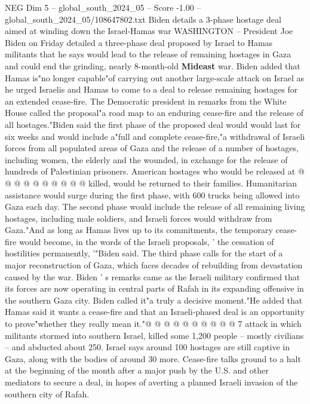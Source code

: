 \begin{textsample}{NEG Dim 5 – global\_south\_2024\_05 – Score -1.00 – global\_south\_2024\_05/108647802.txt}  \label{ex:f5_neg_382}
Biden details a 3-phase hostage deal aimed at winding down the Israel-Hamas war WASHINGTON -- President Joe Biden on Friday detailed a three-phase deal proposed by Israel to Hamas militants that he says would lead to the release of remaining hostages in Gaza and could end the grinding, nearly 8-month-old \textbf{Mideast} war.
Biden added that Hamas is"no longer capable"of carrying out another large-scale attack on Israel as he urged Israelis and Hamas to come to a deal to release remaining hostages for an extended cease-fire.
The Democratic president in remarks from the White House called the proposal"a road map to an enduring cease-fire and the release of all hostages."Biden said the first phase of the proposed deal would would last for six weeks and would include a"full and complete cease-fire,"a withdrawal of Israeli forces from all populated areas of Gaza and the release of a number of hostages, including women, the elderly and the wounded, in exchange for the release of hundreds of Palestinian prisoners.
American hostages who would be released at @ @ @ @ @ @ @ @ @ @ killed, would be returned to their families.
Humanitarian assistance would surge during the first phase, with 600 trucks being allowed into Gaza each day.
The second phase would include the release of all remaining living hostages, including male soldiers, and Israeli forces would withdraw from Gaza."And as long as Hamas lives up to its commitments, the temporary cease-fire would become, in the words of the Israeli proposals, ' the cessation of hostilities permanently, '"Biden said.
The third phase calls for the start of a major reconstruction of Gaza, which faces decades of rebuilding from devastation caused by the war.
Biden ' s remarks came as the Israeli military confirmed that its forces are now operating in central parts of Rafah in its expanding offensive in the southern Gaza city.
Biden called it"a truly a decisive moment."He added that Hamas said it wants a cease-fire and that an Israeli-phased deal is an opportunity to prove"whether they really mean it."@ @ @ @ @ @ @ @ @ @ 7 attack in which militants stormed into southern Israel, killed some 1,200 people -- mostly civilians -- and abducted about 250.
Israel says around 100 hostages are still captive in Gaza, along with the bodies of around 30 more.
Cease-fire talks ground to a halt at the beginning of the month after a major push by the U.S. and other mediators to secure a deal, in hopes of averting a planned Israeli invasion of the southern city of Rafah.

\end{textsample}

